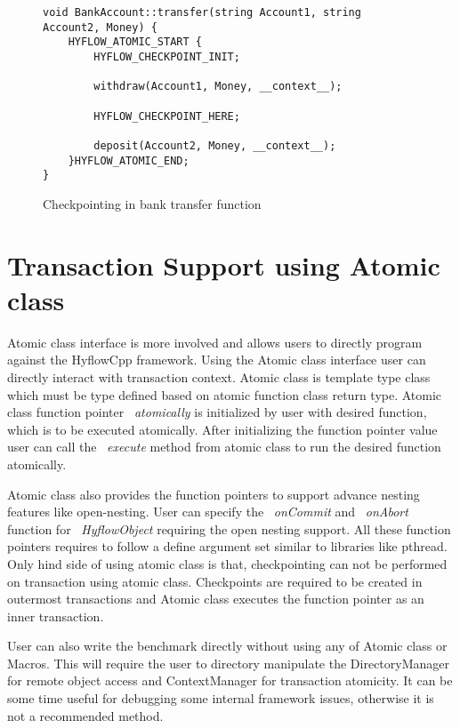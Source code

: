 \documentclass[12pt,english]{report}
\begin{document}
\begin{figure}
\begin{minipage}[b]{0.9\linewidth}\centering
\begin{lstlisting}
void BankAccount::transfer(string Account1, string Account2, Money) {
	HYFLOW_ATOMIC_START {
		HYFLOW_CHECKPOINT_INIT;

		withdraw(Account1, Money, __context__);

		HYFLOW_CHECKPOINT_HERE;
	
		deposit(Account2, Money, __context__);
	}HYFLOW_ATOMIC_END;
}
\end{lstlisting}
\end{minipage}
\caption{Checkpointing in bank transfer function}
\label{Fig:bankCP}
\end{figure}

\section{Transaction Support using Atomic class}

Atomic class interface is more involved and allows users to directly program against the HyflowCpp framework. Using the Atomic class interface user can directly interact with transaction context. Atomic class is template type class which must be type defined based on atomic function class return type. Atomic class function pointer ~\emph{atomically} is initialized by user with desired function, which is to be executed atomically. After initializing the function pointer value user can call the ~\emph{execute} method from atomic class to run the desired function atomically.

Atomic class also provides the function pointers to support advance nesting features like open-nesting. User can specify the ~\emph{onCommit} and ~\emph{onAbort} function for  ~\emph{HyflowObject} requiring the open nesting support. All these function pointers requires to follow a define argument set similar to libraries like pthread. Only hind side of using atomic class is that, checkpointing can not be performed on transaction using atomic class. Checkpoints are required to be created in outermost transactions and Atomic class executes the function pointer as an inner transaction. 

User can also write the benchmark directly without using any of Atomic class or Macros. This will require the user to directory manipulate the DirectoryManager for remote object access and ContextManager for transaction atomicity. It can be some time useful for debugging some internal framework issues, otherwise it is not a recommended method.
\end{document}
